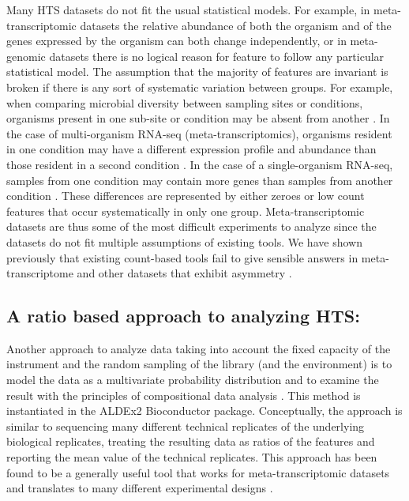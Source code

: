 \documentclass{bmcart}
\begin{document}
Many HTS datasets do not fit the usual statistical models. For example, in meta-transcriptomic datasets the relative abundance of both the organism and of the genes expressed by the organism can both change independently, or in meta-genomic datasets there is no logical reason for feature to follow any particular statistical model. The assumption that the majority of features are invariant is broken if there is any sort of systematic variation between groups. For example, when comparing microbial diversity between sampling sites or conditions, organisms present in one sub-site or condition may be absent from another \cite{Macklaim:2015aa,Hummelen:2010,Gajer:2012}. In the case of multi-organism RNA-seq (meta-transcriptomics), organisms resident in one condition may have a different expression profile and abundance than those resident in a second condition \cite{macklaim:2013}. In the case of a single-organism RNA-seq, samples from one condition may contain more genes than samples from another condition \cite{Lang:2015aa,Peng:2014aa,Zhao:2013aa,Gierlinski:2015aa}. These differences are represented by either zeroes or low count features that occur systematically in only one group. Meta-transcriptomic datasets are thus some of the most difficult experiments to analyze \cite{macklaim:2013,fernandes:2013} since the datasets do not fit multiple assumptions of existing tools. We have shown previously that existing count-based tools fail to give sensible answers in meta-transcriptome and other datasets that exhibit asymmetry  \cite{fernandes:2013, fernandes:2014,gloorAJS:2016}. 

\subsection*{A ratio based approach to analyzing HTS:}
Another approach to analyze data taking into account the fixed capacity of the instrument and the random sampling of the library (and the environment) is to model the data as a multivariate probability distribution and to examine the result with the principles of compositional data analysis \cite{Aitchison:1986,fernandes:2013}. This method is instantiated in the ALDEx2 Bioconductor package. Conceptually, the approach is similar to sequencing many different technical replicates of the underlying biological replicates, treating the resulting data as ratios of the features and reporting the mean value of the technical replicates. This approach has been found to be a generally useful tool that works for meta-transcriptomic datasets \cite{macklaim:2013} and translates to many different experimental designs \cite{fernandes:2014, mcmurrough:2014,gloorFrontiers:2017,Macklaim:2018aa,Almeida:2019aa}. 
\end{document}
